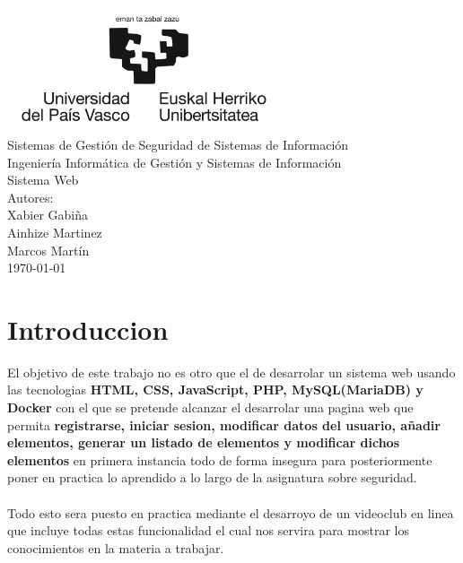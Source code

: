 \documentclass{report}
\begin{document}
    \begin{titlepage}
        \centering
        \includegraphics[width=0.6\textwidth]{./img/miscelanio/logo.jpg}\\
        \vspace{1cm}
        \LARGE Sistemas de Gestión de Seguridad de Sistemas de Información\\
        \vspace{0.5cm}
        \Large Ingeniería Informática de Gestión y Sistemas de Información\\
        \vspace{3cm}
        \Huge Sistema Web\\
        \vspace{2.5cm}
        \Large Autores:\\
        \vspace{0.2cm}
        \large Xabier Gabiña\\
        \large Ainhize Martinez\\
        \large Marcos Martín\\
        \vfill
        \today
    \end{titlepage}
    \tableofcontents
    \chapter{Introduccion}
        El objetivo de este trabajo no es otro que el de desarrolar un  sistema web usando las tecnologias \textbf{HTML, CSS, JavaScript, PHP, MySQL(MariaDB) y Docker} con el que se pretende alcanzar el desarrolar una pagina web que permita \textbf{registrarse, iniciar sesion, modificar datos del usuario, añadir elementos, generar un listado de elementos y modificar dichos elementos} en primera instancia todo de forma insegura para posteriormente poner en practica lo aprendido a lo largo de la asignatura sobre seguridad.
        \\\\
        Todo esto sera puesto en practica mediante el desarroyo de un videoclub en linea que incluye todas estas funcionalidad el cual nos servira para mostrar los conocimientos en la materia a trabajar.
\end{document}
